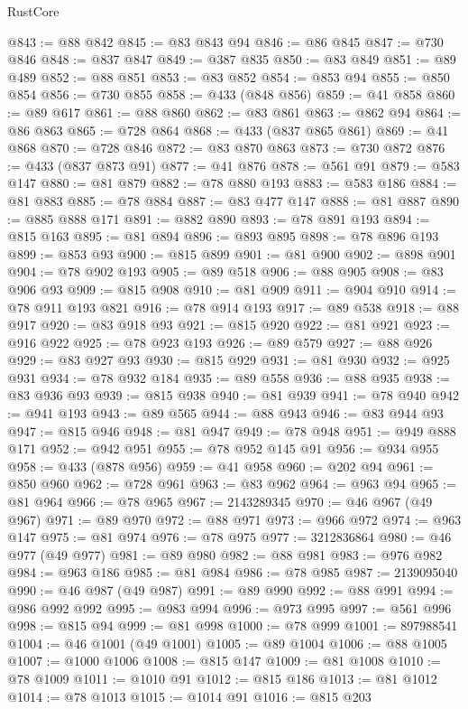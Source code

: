 \begin{lexlean}{RustCore}
\begin{coremodule}
@843 := @88 @842
@845 := @83 @843 @94
@846 := @86 @845
@847 := @730 @846
@848 := @837 @847
@849 := @387 @835
@850 := @83 @849
@851 := @89 @489
@852 := @88 @851
@853 := @83 @852
@854 := @853 @94
@855 := @850 @854
@856 := @730 @855
@858 := @433 (@848 @856)
@859 := @41 @858
@860 := @89 @617
@861 := @88 @860
@862 := @83 @861
@863 := @862 @94
@864 := @86 @863
@865 := @728 @864
@868 := @433 (@837 @865 @861)
@869 := @41 @868
@870 := @728 @846
@872 := @83 @870 @863
@873 := @730 @872
@876 := @433 (@837 @873 @91)
@877 := @41 @876
@878 := @561 @91
@879 := @583 @147
@880 := @81 @879
@882 := @78 @880 @193
@883 := @583 @186
@884 := @81 @883
@885 := @78 @884
@887 := @83 @477 @147
@888 := @81 @887
@890 := @885 @888 @171
@891 := @882 @890
@893 := @78 @891 @193
@894 := @815 @163
@895 := @81 @894
@896 := @893 @895
@898 := @78 @896 @193
@899 := @853 @93
@900 := @815 @899
@901 := @81 @900
@902 := @898 @901
@904 := @78 @902 @193
@905 := @89 @518
@906 := @88 @905
@908 := @83 @906 @93
@909 := @815 @908
@910 := @81 @909
@911 := @904 @910
@914 := @78 @911 @193 @821
@916 := @78 @914 @193
@917 := @89 @538
@918 := @88 @917
@920 := @83 @918 @93
@921 := @815 @920
@922 := @81 @921
@923 := @916 @922
@925 := @78 @923 @193
@926 := @89 @579
@927 := @88 @926
@929 := @83 @927 @93
@930 := @815 @929
@931 := @81 @930
@932 := @925 @931
@934 := @78 @932 @184
@935 := @89 @558
@936 := @88 @935
@938 := @83 @936 @93
@939 := @815 @938
@940 := @81 @939
@941 := @78 @940
@942 := @941 @193
@943 := @89 @565
@944 := @88 @943
@946 := @83 @944 @93
@947 := @815 @946
@948 := @81 @947
@949 := @78 @948
@951 := @949 @888 @171
@952 := @942 @951
@955 := @78 @952 @145 @91
@956 := @934 @955
@958 := @433 (@878 @956)
@959 := @41 @958
@960 := @202 @94
@961 := @850 @960
@962 := @728 @961
@963 := @83 @962
@964 := @963 @94
@965 := @81 @964
@966 := @78 @965
@967 := 2143289345
@970 := @46 @967 (@49 @967)
@971 := @89 @970
@972 := @88 @971
@973 := @966 @972
@974 := @963 @147
@975 := @81 @974
@976 := @78 @975
@977 := 3212836864
@980 := @46 @977 (@49 @977)
@981 := @89 @980
@982 := @88 @981
@983 := @976 @982
@984 := @963 @186
@985 := @81 @984
@986 := @78 @985
@987 := 2139095040
@990 := @46 @987 (@49 @987)
@991 := @89 @990
@992 := @88 @991
@994 := @986 @992 @992
@995 := @983 @994
@996 := @973 @995
@997 := @561 @996
@998 := @815 @94
@999 := @81 @998
@1000 := @78 @999
@1001 := 897988541
@1004 := @46 @1001 (@49 @1001)
@1005 := @89 @1004
@1006 := @88 @1005
@1007 := @1000 @1006
@1008 := @815 @147
@1009 := @81 @1008
@1010 := @78 @1009
@1011 := @1010 @91
@1012 := @815 @186
@1013 := @81 @1012
@1014 := @78 @1013
@1015 := @1014 @91
@1016 := @815 @203

\end{coremodule}
\end{lexlean}
